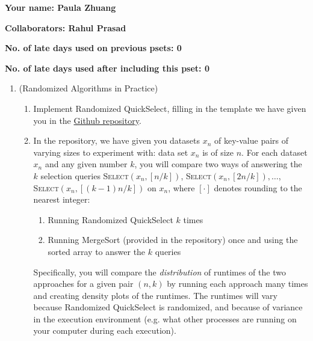 \documentclass[11pt]{article}
\begin{document}


\textbf{Your name: Paula Zhuang}

\textbf{Collaborators: Rahul Prasad}

\textbf{No. of late days used on previous psets: 0}

\textbf{No. of late days used after including this pset: 0}

\begin{enumerate}
    \item (Randomized Algorithms in Practice)  
    \begin{enumerate}
        \item Implement Randomized QuickSelect, filling in the template we have given you in the \href{https://github.com/Harvard-CS-120/cs120/tree/main/fall2023/psets}{Github repository}.  

        \item 
        In the repository, we have given you datasets $x_n$ of
        key-value pairs of varying sizes to experiment with: data set $x_n$ is of size $n$.  For each dataset $x_n$ and any given number $k$, you will compare two ways of answering the $k$ selection queries
        \textsc{Select}$(x_n,[n/k])$, \textsc{Select}$(x_n,[2n/k]), \ldots$, \textsc{Select}$(x_n,[(k-1)n/k])$ on $x_n$, where $[\cdot]$ denotes rounding to the nearest integer:
        \begin{enumerate}
            \item Running Randomized QuickSelect $k$ times
            \item Running MergeSort (provided in the repository) once and using the sorted array to answer the $k$ queries
        \end{enumerate}
        Specifically, you will compare the {\em distribution} of runtimes of the two approaches for a given pair $(n,k)$ by running each approach many times and creating density plots of the runtimes.  The runtimes will vary because Randomized QuickSelect  is randomized, and because of variance in the execution environment (e.g. what other processes are running on your computer during each execution). \vspace{1.5mm}
        

\end{enumerate}
\end{enumerate}
\end{document}
